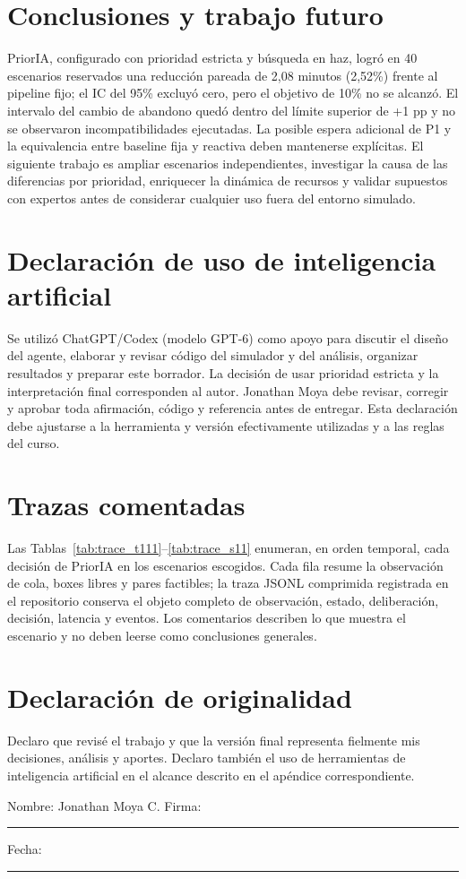 \documentclass[conference]{IEEEtran}
\begin{document}
\section{Conclusiones y trabajo futuro}
PriorIA, configurado con prioridad estricta y búsqueda en haz, logró en 40 escenarios reservados una reducción pareada de 2,08 minutos (2,52\%) frente al pipeline fijo; el IC del 95\% excluyó cero, pero el objetivo de 10\% no se alcanzó. El intervalo del cambio de abandono quedó dentro del límite superior de +1 pp y no se observaron incompatibilidades ejecutadas. La posible espera adicional de P1 y la equivalencia entre baseline fija y reactiva deben mantenerse explícitas. El siguiente trabajo es ampliar escenarios independientes, investigar la causa de las diferencias por prioridad, enriquecer la dinámica de recursos y validar supuestos con expertos antes de considerar cualquier uso fuera del entorno simulado.

\appendices
\section{Declaración de uso de inteligencia artificial}
Se utilizó ChatGPT/Codex (modelo GPT-6) como apoyo para discutir el diseño del agente, elaborar y revisar código del simulador y del análisis, organizar resultados y preparar este borrador. La decisión de usar prioridad estricta y la interpretación final corresponden al autor. Jonathan Moya debe revisar, corregir y aprobar toda afirmación, código y referencia antes de entregar. Esta declaración debe ajustarse a la herramienta y versión efectivamente utilizadas y a las reglas del curso.

\section{Trazas comentadas}
Las Tablas~\ref{tab:trace_t111}--\ref{tab:trace_s11} enumeran, en orden temporal, cada decisión de PriorIA en los escenarios escogidos. Cada fila resume la observación de cola, boxes libres y pares factibles; la traza JSONL comprimida registrada en el repositorio conserva el objeto completo de observación, estado, deliberación, decisión, latencia y eventos. Los comentarios describen lo que muestra el escenario y no deben leerse como conclusiones generales.

\onecolumn


\section{Declaración de originalidad}
Declaro que revisé el trabajo y que la versión final representa fielmente mis decisiones, análisis y aportes. Declaro también el uso de herramientas de inteligencia artificial en el alcance descrito en el apéndice correspondiente.

\vspace{1.5cm}
Nombre: Jonathan Moya C. \hfill Firma: \rule{4cm}{0.4pt}

Fecha: \rule{4cm}{0.4pt}

\twocolumn
\balance


\end{document}
